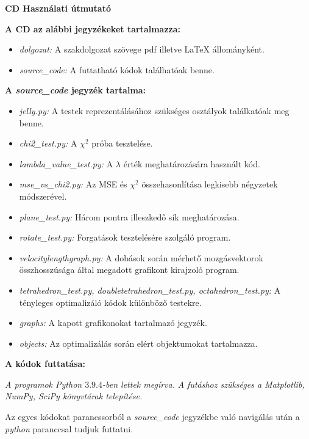 \pagestyle{empty}

\noindent \textbf{\Large CD Használati útmutató}

\vskip 1cm

\noindent \textbf{A CD az alábbi jegyzékeket tartalmazza:}
\begin{itemize}
	\item\textit{dolgozat:} A szakdolgozat szövege pdf illetve LaTeX állományként.
	\item\textit{source{\_}code:} A futtatható kódok találhatóak benne.
\end{itemize}

\noindent\textbf{A \textit{source{\_}code} jegyzék tartalma:}
\begin{itemize}
	\item\textit{jelly.py:} A testek reprezentálásához szükséges osztályok találkatóak meg benne.
	\item\textit{chi2{\_}test.py:} A $\chi^2$ próba tesztelése.
	\item\textit{lambda{\_}value{\_}test.py:} A $\lambda$ érték meghatározására használt kód.
	\item\textit{mse{\_}vs{\_}chi2.py:} Az MSE és $\chi^2$ összehasonlítása legkisebb négyzetek módszerével.
	\item\textit{plane{\_}test.py:} Három pontra illeszkedő sík meghatározása.
	\item\textit{rotate{\_}test.py:} Forgatások tesztelésére szolgáló program.
	\item\textit{velocitylengthgraph.py:} A dobások során mérhető mozgásvektorok összhosszúsága által megadott grafikont kirajzoló program.
	\item\textit{tetrahedron{\_}test.py, doubletetrahedron{\_}test.py, octahedron{\_}test.py:} A tényleges optimalizáló kódok különböző testekre.
	\item\textit{graphs:} A kapott grafikonokat tartalmazó jegyzék.
	\item\textit{objects:} Az optimalizálás során elért objektumokat tartalmazza.
\end{itemize}

\noindent\textbf{A kódok futtatása:}

\textit{A programok Python $3.9.4$-ben lettek megírva.}
\textit{A futáshoz szükséges a Matplotlib, NumPy, SciPy könyvtárak telepítése.}

Az egyes kódokat parancssorból a \textit{source{\_}code} jegyzékbe való navigálás után a \textit{python} paranccsal tudjuk futtatni.
